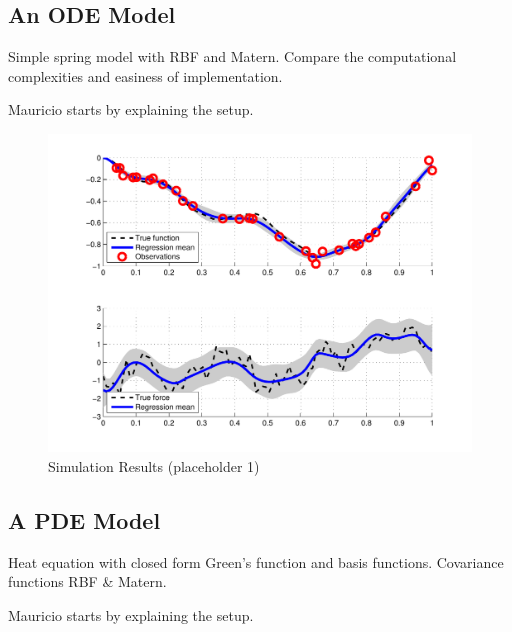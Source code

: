 \documentclass[journal]{IEEEtran}
\newcommand{\simo}[1]{{\color{red}#1}}
\begin{document}
\subsection{An ODE Model}
%
\simo{Simple spring model with RBF and Matern. Compare the computational complexities and easiness of implementation.}

\simo{Mauricio starts by explaining the setup.}

\begin{figure}[!t]
\centering
\includegraphics[width=\columnwidth]{placeholder1}
\caption{Simulation Results (placeholder 1)}
\label{fig_sim}
\end{figure}


\subsection{A PDE Model}
%
\simo{Heat equation with closed form Green's function and basis functions. Covariance functions RBF \& Matern.}

\simo{Mauricio starts by explaining the setup.}
\end{document}
